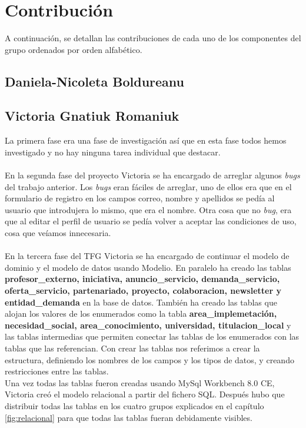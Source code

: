 \documentclass[11pt]{book}
\begin{document}
	\chapter{Contribución}
	A continuación, se detallan las contribuciones de cada uno de los componentes del grupo ordenados por orden alfabético.
	\section{Daniela-Nicoleta Boldureanu}
	\section{Victoria Gnatiuk Romaniuk}
	La primera fase era una fase de investigación así que en esta fase todos hemos investigado y no hay ninguna tarea individual que destacar.\\\\
	En la segunda fase del proyecto Victoria se ha encargado de arreglar algunos \textit{bugs} del trabajo anterior. Los \textit{bugs} eran fáciles de arreglar, uno de ellos era que en el formulario de registro en los campos correo, nombre y apellidos se pedía al usuario que introdujera lo mismo, que era el nombre. Otra cosa que no \textit{bug}, era que al editar el perfil de usuario se pedía volver a aceptar las condiciones de uso, cosa que veíamos innecesaria.\\\\
	En la tercera fase del TFG Victoria se ha encargado de continuar el modelo de dominio y el modelo de datos usando Modelio. En paralelo ha creado las tablas \textbf{profesor\_externo, iniciativa, anuncio\_servicio, demanda\_servicio, oferta\_servicio, partenariado, proyecto, colaboracion, newsletter y entidad\_demanda} en la base de datos. También ha creado las tablas que alojan los valores de los enumerados como la tabla \textbf{area\_implemetación, necesidad\_social, area\_conocimiento, universidad, titulacion\_local} y las tablas intermedias que permiten conectar las tablas de los enumerados con las tablas que las referencian. Con crear las tablas nos referimos a crear la estructura, definiendo los nombres de los campos y los tipos de datos, y creando restricciones entre las tablas.\\
	Una vez todas las tablas fueron creadas usando MySql Workbench 8.0 CE, Victoria creó el modelo relacional a partir del fichero SQL. Después hubo que distribuir todas las tablas en los cuatro grupos explicados en el capítulo \ref{fig:relacional} para que todas las tablas fueran debidamente visibles.\\\\
\end{document}
